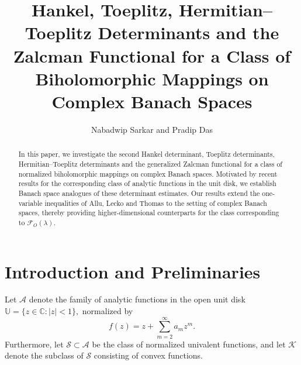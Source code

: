 \documentclass[11pt, reqno]{amsart}
\numberwithin{equation}{section}
\begin{document}
\title[ Hankel, Toeplitz, Hermitian--Toeplitz Determinants and the Zalcman Functional...]{Hankel, Toeplitz, Hermitian--Toeplitz Determinants and the Zalcman Functional for a Class of Biholomorphic Mappings on Complex Banach Spaces}
\author[ N. Sarkar and P. Das]{Nabadwip Sarkar and Pradip Das}
\address{Amity School of Applied Sciences, Amity University Mumbai, Panvel, Navi Mumbai, Maharashtra-410206, India}
\address{Department of Mathematics, Raiganj University, Raiganj, West Bengal-733134, India.}

\makeatletter
{}
\makeatother


\begin{abstract} In this paper, we investigate the second Hankel determinant, Toeplitz determinants, Hermitian--Toeplitz determinants and the generalized Zalcman functional for a class of normalized biholomorphic mappings on complex Banach spaces. Motivated by recent results for the corresponding class of analytic functions in the unit disk, we establish Banach space analogues of these determinant estimates. Our results extend the one-variable inequalities of Allu, Lecko and Thomas \cite{ALT2022} to the setting of complex Banach spaces, thereby providing higher-dimensional counterparts for the class corresponding to $\mathcal{F}_{O}(\lambda)$.

\end{abstract}

\maketitle

\section{Introduction and Preliminaries}

Let $\mathcal{A}$ denote the family of analytic functions in the open unit disk $\mathbb{U}=\{z\in\mathbb{C}:|z|<1\},$
normalized by
\begin{equation}\label{eq:A}
f(z)=z+\sum_{m=2}^{\infty}a_mz^m.
\end{equation}
Furthermore, let $\mathcal{S}\subset\mathcal{A}$ be the class of normalized univalent functions, and let $\mathcal{K}$ denote the subclass of $\mathcal{S}$ consisting of convex functions.
\end{document}
